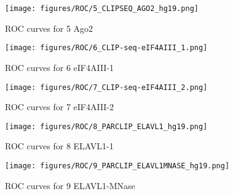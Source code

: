 \documentclass[11pt]{article}
\begin{document}
    \begin{figure}
        \begin{center}
            \texttt{[image: figures/ROC/5\_CLIPSEQ\_AGO2\_hg19.png]}
            \caption{ROC curves for 5 Ago2}
            \label{fig:ROC5 Ago2}
        \end{center}
    \end{figure}

    
    
    \begin{figure}
        \begin{center}
            \texttt{[image: figures/ROC/6\_CLIP-seq-eIF4AIII\_1.png]}
            \caption{ROC curves for 6 eIF4AIII-1}
            \label{fig:ROC6 eIF4AIII-1}
        \end{center}
    \end{figure}

    
    
    \begin{figure}
        \begin{center}
            \texttt{[image: figures/ROC/7\_CLIP-seq-eIF4AIII\_2.png]}
            \caption{ROC curves for 7 eIF4AIII-2}
            \label{fig:ROC7 eIF4AIII-2}
        \end{center}
    \end{figure}

    
    
    \begin{figure}
        \begin{center}
            \texttt{[image: figures/ROC/8\_PARCLIP\_ELAVL1\_hg19.png]}
            \caption{ROC curves for 8 ELAVL1-1}
            \label{fig:ROC8 ELAVL1-1}
        \end{center}
    \end{figure}

    
    
    \begin{figure}
        \begin{center}
            \texttt{[image: figures/ROC/9\_PARCLIP\_ELAVL1MNASE\_hg19.png]}
            \caption{ROC curves for 9 ELAVL1-MNase}
            \label{fig:ROC9 ELAVL1-MNase}
        \end{center}
    \end{figure}
\end{document}
